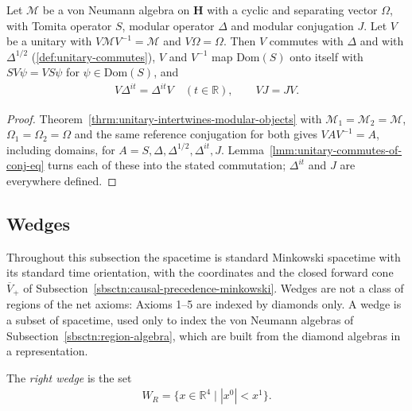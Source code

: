 \begin{corollary}
    \label{crllr:unitary-commutes-modular-objects}
    \leanok
    Let $\mathcal{M}$ be a von Neumann algebra on $\mathbf{H}$ with a cyclic and separating vector $\Omega$, with Tomita operator $S$, modular operator $\Delta$ and modular conjugation $J$. Let $V$ be a unitary with $V\mathcal{M}V^{-1} = \mathcal{M}$ and $V\Omega = \Omega$. Then $V$ commutes with $\Delta$ and with $\Delta^{1/2}$ (\ref{def:unitary-commutes}), $V$ and $V^{-1}$ map $\text{Dom}(S)$ onto itself with $SV\psi = VS\psi$ for $\psi \in \text{Dom}(S)$, and
    \begin{align}
        V\Delta^{it} = \Delta^{it}V \quad (t \in \mathbb{R}), \qquad VJ = JV.
    \end{align}
\end{corollary}
\begin{proof}
    \leanok
    Theorem~\ref{thrm:unitary-intertwines-modular-objects} with $\mathcal{M}_1 = \mathcal{M}_2 = \mathcal{M}$, $\Omega_1 = \Omega_2 = \Omega$ and the same reference conjugation for both gives $VAV^{-1} = A$, including domains, for $A = S, \Delta, \Delta^{1/2}, \Delta^{it}, J$. Lemma~\ref{lmm:unitary-commutes-of-conj-eq} turns each of these into the stated commutation; $\Delta^{it}$ and $J$ are everywhere defined.
\end{proof}

\subsection{Wedges}\label{sbsctn:wedges}

Throughout this subsection the spacetime is standard Minkowski spacetime with its standard time orientation, with the coordinates and the closed forward cone $\overline{V}_+$ of Subsection~\ref{sbsctn:causal-precedence-minkowski}. Wedges are not a class of regions of the net axioms: Axioms 1--5 are indexed by diamonds only. A wedge is a subset of spacetime, used only to index the von Neumann algebras of Subsection~\ref{sbsctn:region-algebra}, which are built from the diamond algebras in a representation.

\begin{definition}
    \label{def:right-wedge}
    \leanok
    The \emph{right wedge} is the set
    \begin{align}
        W_R = \{ x \in \mathbb{R}^4 \mid |x^0| < x^1 \}.
    \end{align}
\end{definition}

